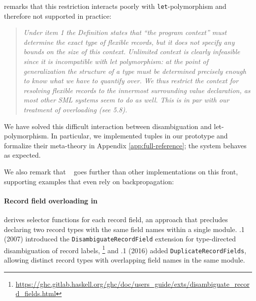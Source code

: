 \documentclass[acmsmall,screen,nonacm%
\Anonymous{,anonymous}{}%
\Final{}{,review}%
]{acmart}
\begin{document}
\citet*[page 36]{rossberg-hamlet} remarks that this restriction interacts
poorly with \texttt{let}-polymorphism and therefore not supported in practice:
%
\begin{quotation}\em
  Under item 1 the Definition states that “the program context” must
  determine the exact type of flexible records, but it does not
  specify any bounds on the size of this context. Unlimited context is
  clearly infeasible since it is incompatible with let polymorphism:
  at the point of generalization the structure of a type must be
  determined precisely enough to know what we have to quantify
  over. We thus restrict the context for resolving flexible records to
  the innermost surrounding value declaration, as most other SML
  systems seem to do as well. This is in par with our treatment of
  overloading (see 5.8).
\end{quotation}
%
We have solved this difficult interaction between disambiguation and
let-polymorphism. In particular, we implemented tuples in our
prototype and formalize their meta-theory in Appendix
\cref{app:full-reference}; the system behaves as expected.

We also remark that \PolySML~\citep*{sml-polyml} goes further than other \SML
implementations on this front, supporting examples that even rely on
backpropagation:

\paragraph{Record field overloading in \GHC}

 derives selector functions for each record field, an approach that
precludes declaring two record types with the same field names within a single
module. .1 (2007) introduced the \texttt{DisambiguateRecordField}
extension for type-directed disambiguation of record labels,%
%
\footnote{
  \url{https://ghc.gitlab.haskell.org/ghc/doc/users_guide/exts/disambiguate_record_fields.html}
}
%
and .1 (2016) added \texttt{DuplicateRecordFields}, allowing distinct
record types with overlapping field names in the same module.
\end{document}
